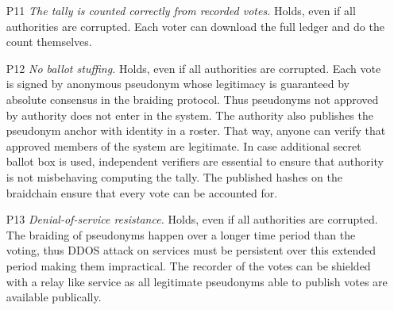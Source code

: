 \documentclass[12pt,a4paper]{article}
\begin{document}
\begin{itemize}
\item
[P11] \textit{The tally is counted correctly from recorded votes.} Holds, even if all authorities are corrupted. Each voter can download the full ledger and do the count themselves.\par
\item
[P12] \textit{No ballot stuffing.} Holds, even if all authorities are corrupted. Each vote is signed by anonymous pseudonym whose legitimacy is guaranteed by absolute consensus in the braiding protocol. Thus pseudonyms not approved by authority does not enter in the system. The authority also publishes the pseudonym anchor with identity in a roster. That way, anyone can verify that approved members of the system are legitimate.
In case additional secret ballot box is used, independent verifiers are essential to ensure that authority is not misbehaving computing the tally. The published hashes on the braidchain ensure that every vote can be accounted for.\par
\item
[P13] \textit{Denial-of-service resistance.} Holds, even if all authorities are corrupted. The braiding of pseudonyms happen over a longer time period than the voting, thus DDOS attack on services must be persistent over this extended period making them impractical. The recorder of the votes can be shielded with a relay like service as all legitimate pseudonyms able to publish votes are available publically.\par
\end{itemize}
\end{document}
